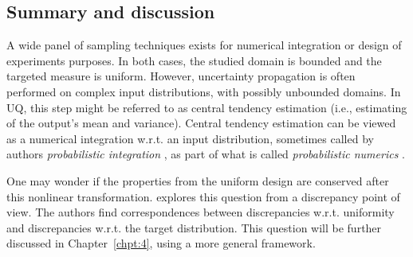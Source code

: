 \subsection{Summary and discussion}
A wide panel of sampling techniques exists for numerical integration or design of experiments purposes. 
In both cases, the studied domain is bounded and the targeted measure is uniform. 
However, uncertainty propagation is often performed on complex input distributions, with possibly unbounded domains. 
In UQ, this step might be referred to as central tendency estimation (i.e., estimating of the output's mean and variance). 
Central tendency estimation can be viewed as a numerical integration w.r.t. an input distribution, sometimes called by authors \textit{probabilistic integration} \citep{briol_oates_2019}, as part of what is called \textit{probabilistic numerics} \citep{oates_sullivan_2019}.  


One may wonder if the properties from the uniform design are conserved after this nonlinear transformation. 
\citet{hickernell_2020} explores this question from a discrepancy point of view. 
The authors find correspondences between discrepancies w.r.t. uniformity and discrepancies w.r.t. the target distribution. 
This question will be further discussed in Chapter~\ref{chpt:4}, using a more general framework.


